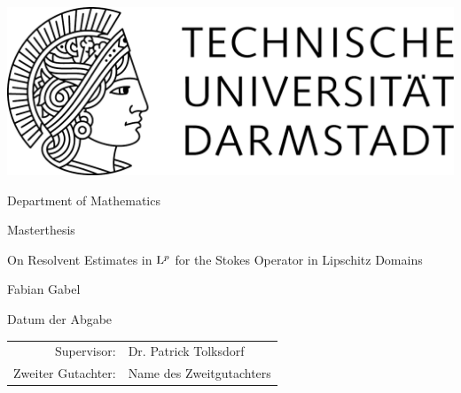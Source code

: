 \begin{titlepage}
  \begin{center}
    \includegraphics[width=0.5\linewidth]{TU_Darmstadt_Logo.pdf}
    \vfill
    
    \large{Department of Mathematics}
    \vfill
    
    \large{Masterthesis}
    \vfill

    \huge{On Resolvent Estimates in $\mathrm{L}^p$ for the Stokes Operator in Lipschitz Domains}
    \vfill
    
		\large
    Fabian Gabel
    \vfill

    Datum der Abgabe
    \vfill
\begin{tabular}{rl}
    Supervisor:& Dr. Patrick Tolksdorf
    \\
    Zweiter Gutachter:& Name des Zweitgutachters
\end{tabular}
  \end{center}
\end{titlepage}
